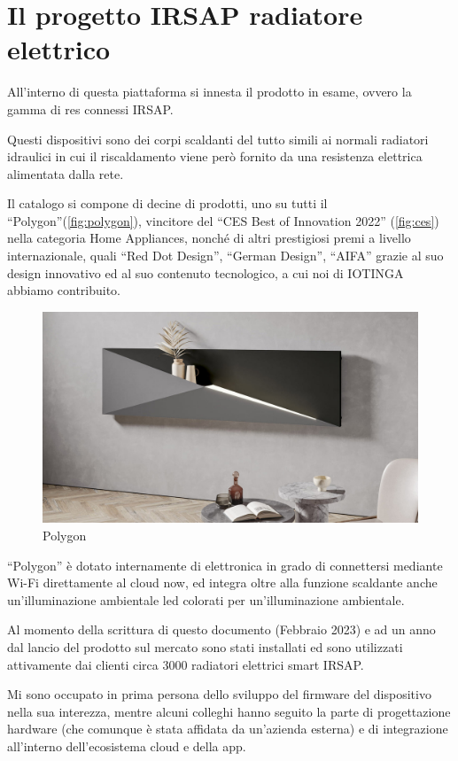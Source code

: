 \documentclass[12pt,a4paper,twoside,titlepage]{book}
\begin{document}
\section{Il progetto IRSAP radiatore elettrico}

All'interno di questa piattaforma si innesta il prodotto in esame,
ovvero la gamma di \glspl{re} connessi IRSAP.

Questi dispositivi sono dei corpi scaldanti del tutto simili ai normali radiatori
idraulici in cui il riscaldamento viene però fornito da una resistenza elettrica
alimentata dalla rete.

Il catalogo si compone di
decine di prodotti, uno su tutti il ``Polygon''(\autoref{fig:polygon}), vincitore del
``CES Best of Innovation 2022'' (\autoref{fig:ces}) nella categoria Home Appliances,
nonché di altri prestigiosi premi a livello internazionale, quali ``Red Dot Design'',
``German Design'', ``AIFA'' %
grazie al suo design innovativo ed al suo contenuto tecnologico,
a cui noi di IOTINGA abbiamo contribuito.

\begin{figure}[ht]
    \centering
    \includegraphics[width=12cm]{img/polygon.jpeg}
    \caption{Polygon}
    \label{fig:polygon}
\end{figure}

``Polygon'' è dotato internamente di elettronica in grado di connettersi mediante
Wi-Fi direttamente al cloud \Gls{now}, ed integra oltre alla funzione scaldante
anche un'illuminazione ambientale \acrshort{led} colorati per un'illuminazione ambientale.

Al momento della scrittura di questo documento (Febbraio 2023) e ad un anno dal lancio
del prodotto sul mercato sono stati installati ed sono utilizzati attivamente dai clienti
circa 3000 radiatori elettrici smart IRSAP.

Mi sono occupato in prima persona dello sviluppo del \gls{firmware} del dispositivo nella
sua interezza, mentre alcuni colleghi hanno seguito la parte di progettazione hardware
(che comunque è stata affidata da un'azienda esterna) e di integrazione all'interno
dell'ecosistema cloud e della app.
\end{document}
